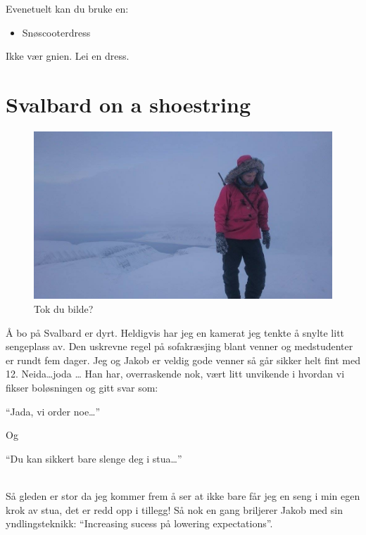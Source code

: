 Evenetuelt kan du bruke en:

\begin{itemize}
		\item Snøscooterdress
\end{itemize}

Ikke vær gnien. Lei en dress. \\

\section*{Svalbard on a shoestring}

\begin{figure}[H]
	\centering
	\includegraphics[width=\textwidth]{tokdubildet}
	\caption{Tok du bilde?}
\label{fig:tokdubilde}
\end{figure}

Å bo på Svalbard er dyrt. Heldigvis har jeg en kamerat jeg
tenkte å snylte litt sengeplass av. Den uskrevne regel på sofakræsjing
blant venner og medstudenter er rundt fem dager. Jeg og Jakob er veldig gode venner så går sikker helt fint
med 12. Neida\ldots joda \ldots  
Han har, overraskende nok, vært litt unvikende i hvordan vi fikser
boløsningen og
gitt svar som: 
\begin{dialogue}
	\item ``Jada, vi order noe\ldots''
\end{dialogue}
Og 
\begin{dialogue}
	\item ``Du kan sikkert bare slenge deg i stua\ldots''
\end{dialogue}\\
Så gleden er stor da jeg kommer frem
å ser at ikke bare får jeg en seng i min egen krok av stua, det er
redd opp i tillegg! Så nok en gang briljerer Jakob med sin
yndlingsteknikk: ``Increasing sucess på lowering expectations''.\\



